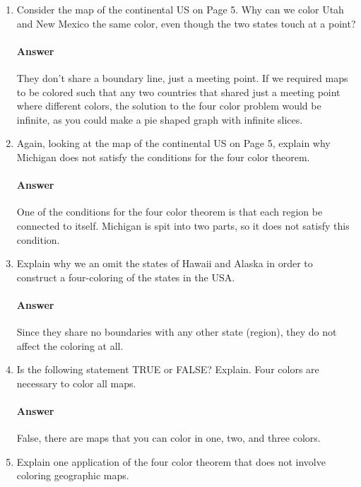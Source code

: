 \documentclass{article}
\begin{document}
\begin{enumerate}

    \item Consider the map of the continental US on Page 5.  Why can we color
        Utah and New Mexico the same color, even though the two states touch at
        a point?

        \paragraph{Answer}
       	They don't share a boundary line, just a meeting point. If we required maps 
		to be colored such that any two countries that shared just a meeting point 
		where different colors, the solution to the four color problem would be infinite,
		as you could make a pie shaped graph with infinite slices.

    \item Again, looking at the map of the continental US on Page 5, explain why
        Michigan does not satisfy the conditions for the four color theorem.

        \paragraph{Answer}
        	One of the conditions for the four color theorem is that each region be connected 
		to itself. Michigan is spit into two parts, so it does not satisfy this condition.

    \item Explain why we an omit the states of Hawaii and Alaska in order to
        construct a four-coloring of the states in the USA.

        \paragraph{Answer}
        Since they share no boundaries with any other state (region), they do not affect the coloring at all.

    \item Is the following statement TRUE or FALSE?  Explain. Four colors are
        necessary to color all maps.

        \paragraph{Answer}
        False, there are maps that you can color in one, two, and three colors.

    \item Explain one application of the four color theorem that does not
        involve coloring geographic maps.


\end{enumerate}
\end{document}
